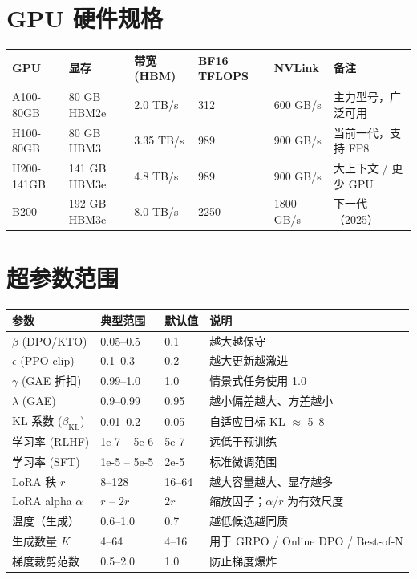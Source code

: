 \section{GPU 硬件规格}
\label{gpu-hardware-specs}

{\footnotesize
\noindent\begin{tabularx}{\linewidth}{@{}l l l l l Z{1}@{}}
\toprule
\textbf{GPU} & \textbf{显存} & \textbf{带宽 (HBM)} & \textbf{BF16 TFLOPS} & \textbf{NVLink} & \textbf{备注} \\
\midrule
A100-80GB & 80 GB HBM2e & 2.0 TB/s & 312 & 600 GB/s & 主力型号，广泛可用 \\
H100-80GB & 80 GB HBM3 & 3.35 TB/s & 989 & 900 GB/s & 当前一代，支持 FP8 \\
H200-141GB & 141 GB HBM3e & 4.8 TB/s & 989 & 900 GB/s & 大上下文 / 更少 GPU \\
B200 & 192 GB HBM3e & 8.0 TB/s & 2250 & 1800 GB/s & 下一代（2025） \\
\bottomrule
\end{tabularx}
}

\section{超参数范围}
\label{hyperparameter-ranges}

\begin{center}
\begin{tabularx}{0.88\linewidth}{@{}l Z{0.61} Z{0.42} Z{1.97}@{}}
\toprule
\textbf{参数} & \textbf{典型范围} & \textbf{默认值} & \textbf{说明} \\
\midrule
$\beta$ (DPO/KTO) & 0.05--0.5 & 0.1 & 越大越保守 \\
$\epsilon$ (PPO clip) & 0.1--0.3 & 0.2 & 越大更新越激进 \\
$\gamma$ (GAE 折扣) & 0.99--1.0 & 1.0 & 情景式任务使用 1.0 \\
$\lambda$ (GAE) & 0.9--0.99 & 0.95 & 越小偏差越大、方差越小 \\
KL 系数 ($\beta_\text{KL}$) & 0.01--0.2 & 0.05 & 自适应目标 KL $\approx$ 5--8 \\
学习率 (RLHF) & 1e-7 -- 5e-6 & 5e-7 & 远低于预训练 \\
学习率 (SFT) & 1e-5 -- 5e-5 & 2e-5 & 标准微调范围 \\
LoRA 秩 $r$ & 8--128 & 16--64 & 越大容量越大、显存越多 \\
LoRA alpha $\alpha$ & $r$ -- $2r$ & $2r$ & 缩放因子；$\alpha/r$ 为有效尺度 \\
温度（生成） & 0.6--1.0 & 0.7 & 越低候选越同质 \\
生成数量 $K$ & 4--64 & 4--16 & 用于 GRPO / Online DPO / Best-of-N \\
梯度裁剪范数 & 0.5--2.0 & 1.0 & 防止梯度爆炸 \\
\bottomrule
\end{tabularx}
\end{center}

